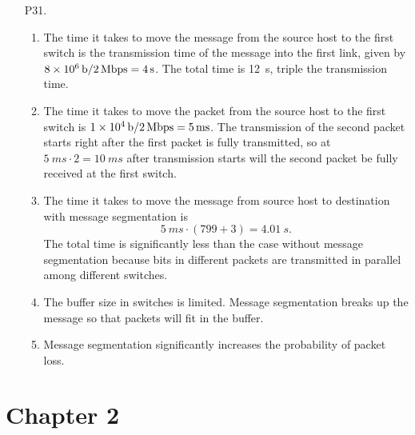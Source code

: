 \documentclass{article}
\begin{document}
\begin{enumerate}
    \item[P31.] \begin{enumerate}
        \item The time it takes to move the message from the source host to the first switch is the transmission time of the message into the first link, given by $\SI{8d6}{b} / \SI{2}{Mbps} = \SI{4}{s}$. The total time is \SI{12}{s}, triple the transmission time.
        \item The time it takes to move the packet from the source host to the first switch is $\SI{1d4}{b} / \SI{2}{Mbps} = \SI{5}{ms}$. The transmission of the second packet starts right after the first packet is fully transmitted, so at $\SI{5}{ms} \cdot 2 = \SI{10}{ms}$ after transmission starts will the second packet be fully received at the first switch.
        \item The time it takes to move the message from source host to destination with message segmentation is
        \[
            \SI{5}{ms} \cdot (799 + 3) = \SI{4.01}{s}.
        \]
        The total time is significantly less than the case without message segmentation because bits in different packets are transmitted in parallel among different switches.
        \item The buffer size in switches is limited. Message segmentation breaks up the message so that packets will fit in the buffer.
        \item Message segmentation significantly increases the probability of packet loss.
    \end{enumerate}
\end{enumerate}

\section*{Chapter 2}
\end{document}
